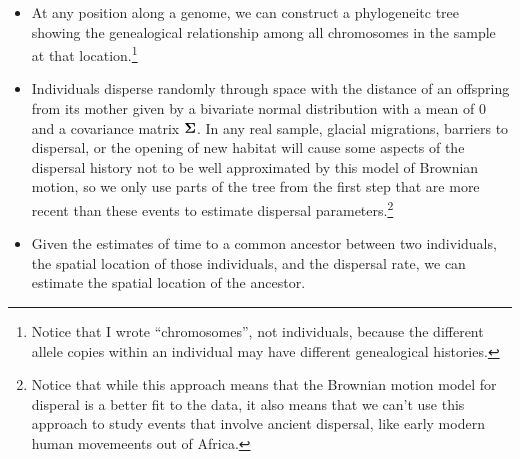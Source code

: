 \begin{itemize}

  \item At any position along a genome, we can construct a
    phylogeneitc tree showing the genealogical relationship among all
    chromosomes in the sample at that location.\footnote{Notice that I
      wrote ``chromosomes'', not individuals, because the different
      allele copies within an individual may have different
      genealogical histories.} 

  \item Individuals disperse randomly through space with the distance
    of an offspring from its mother given by a bivariate normal
    distribution with a mean of 0 and a covariance matrix
    $\bf\Sigma$. In any real sample, glacial migrations,
    barriers to dispersal, or the opening of new habitat will cause
    some aspects of the dispersal history not to be well approximated
    by this model of Brownian motion, so we only use parts of the tree
    from the first step that are more recent than these events to
    estimate dispersal parameters.\footnote{Notice that while this
      approach means that the Brownian motion model for disperal is a
      better fit to the data, it also means that we can't use this
      approach to study events that involve ancient dispersal, like
      early modern human movemeents out of Africa.}

  \item Given the estimates of time to a common ancestor between two
    individuals, the spatial location of those individuals, and the
    dispersal rate, we can estimate the spatial location of the
    ancestor. 

\end{itemize}

